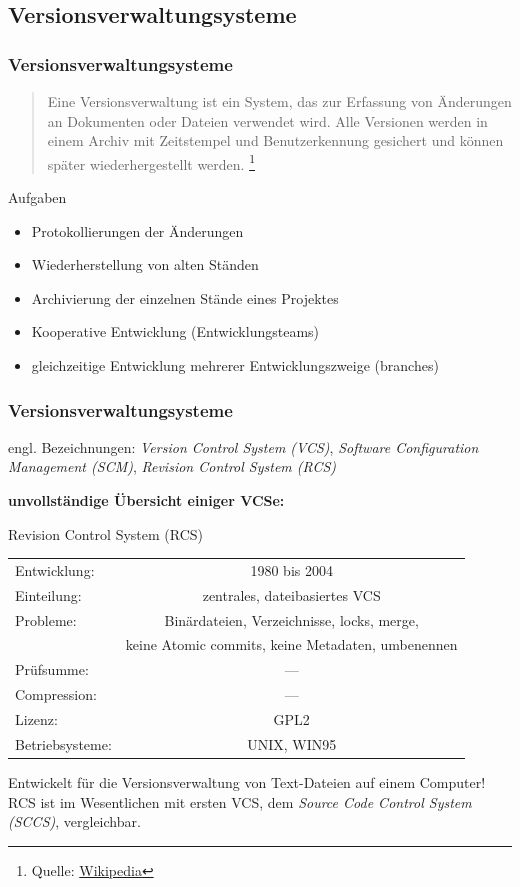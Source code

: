 \documentclass{beamer}
\begin{document}
\subsection{Versionsverwaltungsysteme}
\begin{frame}\frametitle{Versionsverwaltungsysteme} 

\begin{quote}
Eine Versionsverwaltung ist ein System, das zur Erfassung von Änderungen an Dokumenten oder Dateien verwendet wird. Alle Versionen werden in einem Archiv mit Zeitstempel und Benutzerkennung gesichert und können später wiederhergestellt werden.
\footnote{Quelle: \href{http://de.wikipedia.org/wiki/Versionsverwaltung}{Wikipedia}}
\end{quote} 

Aufgaben
\begin{itemize}
\item  Protokollierungen der Änderungen
\item  Wiederherstellung von alten Ständen 
\item  Archivierung der einzelnen Stände eines Projektes
\item  Kooperative Entwicklung (Entwicklungsteams)
\item  gleichzeitige Entwicklung mehrerer Entwicklungszweige (branches)
\end{itemize} 
\end{frame}

\begin{frame}\frametitle{Versionsverwaltungsysteme} 

engl. Bezeichnungen: \textit{Version Control System (VCS)}, \textit{Software Configuration Management (SCM)}, \textit{Revision Control System (RCS)}

\vspace*{0.15cm}
\textbf{unvollständige Übersicht einiger VCSe:}
\begin{block}{Revision Control System (RCS)}
	\begin{tabular}{l c}
Entwicklung: & 1980 bis 2004  \\  
Einteilung: & zentrales, dateibasiertes VCS \\ 
Probleme: & Binärdateien, Verzeichnisse, locks, merge, \\
          & keine Atomic commits, keine Metadaten, umbenennen  \\
Prüfsumme: & --- \\
Compression: & --- \\
Lizenz: & GPL2 \\
Betriebsysteme: & UNIX, WIN95 \\

\end{tabular} 

\vspace*{0.3cm}
Entwickelt für die Versionsverwaltung von Text-Dateien auf einem Computer!
RCS ist im Wesentlichen mit ersten VCS, dem \textit{Source Code Control System (SCCS)}, vergleichbar.
\end{block}


\end{frame}
\end{document}
